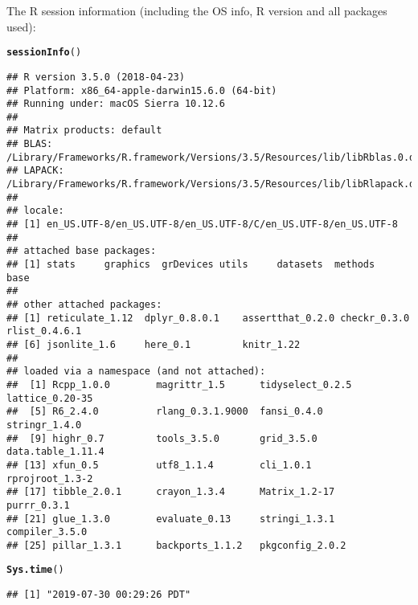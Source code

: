 \documentclass{article}\usepackage[]{graphicx}\usepackage[]{color}
\makeatletter
\newcommand{\hlstd}[1]{\textcolor[rgb]{0.345,0.345,0.345}{#1}}%
\newcommand{\hlkwd}[1]{\textcolor[rgb]{0.737,0.353,0.396}{\textbf{#1}}}%
\newenvironment{kframe}{%
 \def\at@end@of@kframe{}%
 \ifinner\ifhmode%
  \def\at@end@of@kframe{\end{minipage}}%
  \begin{minipage}{\columnwidth}%
 \fi\fi%
 \def\FrameCommand##1{\hskip\@totalleftmargin \hskip-\fboxsep
 \colorbox{shadecolor}{##1}\hskip-\fboxsep
     \hskip-\linewidth \hskip-\@totalleftmargin \hskip\columnwidth}%
 \MakeFramed {\advance\hsize-\width
   \@totalleftmargin\z@ \linewidth\hsize
   \@setminipage}}%
 {\par\unskip\endMakeFramed%
 \at@end@of@kframe}
\newenvironment{knitrout}{}{} %
\makeatother
\begin{document}
The R session information (including the OS info, R version and all
packages used):

\begin{knitrout}
\color{fgcolor}\begin{kframe}
\begin{alltt}
\hlkwd{sessionInfo}\hlstd{()}
\end{alltt}
\begin{verbatim}
## R version 3.5.0 (2018-04-23)
## Platform: x86_64-apple-darwin15.6.0 (64-bit)
## Running under: macOS Sierra 10.12.6
## 
## Matrix products: default
## BLAS: /Library/Frameworks/R.framework/Versions/3.5/Resources/lib/libRblas.0.dylib
## LAPACK: /Library/Frameworks/R.framework/Versions/3.5/Resources/lib/libRlapack.dylib
## 
## locale:
## [1] en_US.UTF-8/en_US.UTF-8/en_US.UTF-8/C/en_US.UTF-8/en_US.UTF-8
## 
## attached base packages:
## [1] stats     graphics  grDevices utils     datasets  methods   base     
## 
## other attached packages:
## [1] reticulate_1.12  dplyr_0.8.0.1    assertthat_0.2.0 checkr_0.3.0     rlist_0.4.6.1   
## [6] jsonlite_1.6     here_0.1         knitr_1.22      
## 
## loaded via a namespace (and not attached):
##  [1] Rcpp_1.0.0        magrittr_1.5      tidyselect_0.2.5  lattice_0.20-35  
##  [5] R6_2.4.0          rlang_0.3.1.9000  fansi_0.4.0       stringr_1.4.0    
##  [9] highr_0.7         tools_3.5.0       grid_3.5.0        data.table_1.11.4
## [13] xfun_0.5          utf8_1.1.4        cli_1.0.1         rprojroot_1.3-2  
## [17] tibble_2.0.1      crayon_1.3.4      Matrix_1.2-17     purrr_0.3.1      
## [21] glue_1.3.0        evaluate_0.13     stringi_1.3.1     compiler_3.5.0   
## [25] pillar_1.3.1      backports_1.1.2   pkgconfig_2.0.2
\end{verbatim}
\begin{alltt}
\hlkwd{Sys.time}\hlstd{()}
\end{alltt}
\begin{verbatim}
## [1] "2019-07-30 00:29:26 PDT"
\end{verbatim}
\end{kframe}
\end{knitrout}
\end{document}
